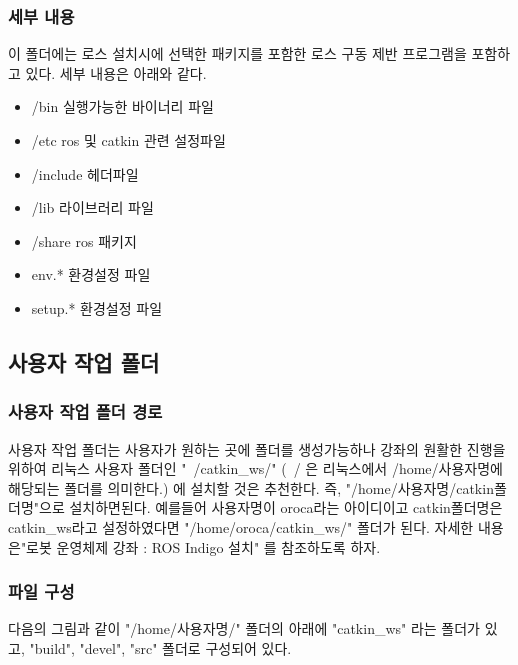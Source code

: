 \subsubsection{세부 내용}

이 폴더에는 로스 설치시에 선택한 패키지를 포함한 로스 구동 제반 프로그램을 포함하고 있다. 세부 내용은 아래와 같다.

\begin{itemize}
\item /bin 실행가능한 바이너리 파일
\item /etc ros 및 catkin 관련 설정파일
\item /include 헤더파일
\item /lib 라이브러리 파일
\item /share ros 패키지
\item env.* 환경설정 파일
\item setup.* 환경설정 파일
\end{itemize}

\subsection{사용자 작업 폴더}

\subsubsection{사용자 작업 폴더 경로}

사용자 작업 폴더는 사용자가 원하는 곳에 폴더를 생성가능하나 강좌의 원활한 진행을 위하여 리눅스 사용자 폴더인 "~/catkin\_ws/" (~/ 은 리눅스에서 /home/사용자명에 해당되는 폴더를 의미한다.) 에 설치할 것은 추천한다. 즉, "/home/사용자명/catkin폴더명"으로 설치하면된다. 예를들어 사용자명이 oroca라는 아이디이고 catkin폴더명은 catkin\_ws라고 설정하였다면 "/home/oroca/catkin\_ws/" 폴더가 된다. 자세한 내용은"로봇 운영체제 강좌 : ROS Indigo 설치" 를 참조하도록 하자. 

\subsubsection{파일 구성}

다음의 그림과 같이 "/home/사용자명/" 폴더의 아래에 "catkin\_ws" 라는 폴더가 있고, "build", "devel", "src" 폴더로 구성되어 있다. 

